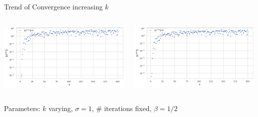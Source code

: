 \documentclass{beamer}
\begin{document}
\begin{frame}{Trend of Convergence increasing $k$}
	\begin{minipage}[0.95\textheight]{\textwidth}
	\begin{columns}[T]
	\begin{column}{0.50\textwidth}
	\includegraphics[width=\textwidth, keepaspectratio]{../images/d_conv_N.png}
	\end{column}
	\begin{column}{0.50\textwidth}
	\includegraphics[width=\textwidth, keepaspectratio]{../images/v_conv_N.png}
	\end{column}
	\end{columns}
	\end{minipage}
	\begin{center}
		Parameters: $k$ varying, $\sigma=1$, \# iterations fixed, $\beta=1/2$
	\end{center}
\end{frame}
\end{document}
